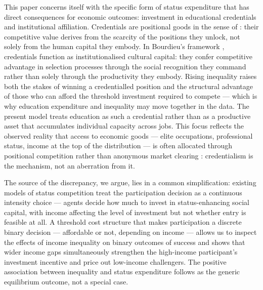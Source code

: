 \documentclass[
    oneside,
    fontsize=10pt,leqno]{article}
\begin{document}
This paper concerns itself with the specific form of status
expenditure that has direct consequences for economic outcomes:
investment in educational credentials and institutional affiliation.
Credentials are positional goods in the sense of
\citet{HirschSocialLimits}: their competitive value derives from
the scarcity of the positions they unlock, not solely from the
human capital they embody. In Bourdieu's framework \citep{Bourdieu1977,Bourdieu1986}, credentials function as institutionalised cultural capital: they confer competitive advantage in selection processes through the social recognition they command rather than solely through the productivity they embody. Rising inequality raises both the stakes of winning a
credentialled position and the structural advantage of those who can
afford the threshold investment required to compete --- which is why
education expenditure and inequality may move together in the data. The
present model treats education as such a credential rather than as
a productive asset that accumulates individual capacity across jobs.
This focus reflects the observed reality that access to economic
goods --- elite occupations, professional status, income at the top
of the distribution --- is often allocated through positional
competition rather than anonymous market clearing
\citep{Rivera2015Pedigree, LaurisonFriedman2016, Bourdieu1986}:
credentialism is the mechanism, not an aberration from it.

The source of the discrepancy, we argue, lies in a common
simplification: existing models of status competition treat the
participation decision as a continuous intensity choice --- agents
decide how much to invest in status-enhancing social capital, with
income affecting the level of investment but not whether entry is
feasible at all. A threshold cost structure that makes
participation a discrete binary decision --- affordable or not,
depending on income --- allows us to inspect the effects of income inequality on binary outcomes of success and shows that wider income gaps simultaneously strengthen the
high-income participant's investment incentive and price out
low-income challengers. The positive association between inequality
and status expenditure follows as the generic equilibrium outcome, not a special case.
\end{document}
